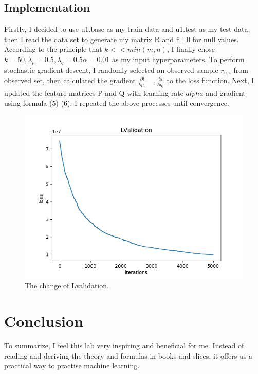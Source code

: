 \documentclass[journal, a4paper]{IEEEtran}
\begin{document}
\subsection{Implementation}
Firstly, I decided to use u1.base as my train data and u1.test as my test data, then I read the data set to generate my matrix R and fill 0 for null values. According to the principle that $k << min(m,n)$, I finally chose $k = 50, \lambda_p = 0.5, \lambda_q = 0.5 \alpha = 0.01$ as my input hyperparameters. To perform stochastic gradient descent, I randomly selected an observed sample $r_{u,i}$ from observed set, then calculated the gradient $\frac{\partial l}{\partial p_u} \quad, \frac{\partial l}{\partial q_i}$ to the loss function. Next, I updated the feature matrices P and Q with learning rate $alpha$ and gradient using formula (5) (6). I repeated the above processes until convergence.
\begin{figure}[!hbt]
	\begin{center}
	\includegraphics[width=\columnwidth]{result.png}
	\caption{The change of Lvalidation.}
	\label{fig2}
	\end{center}
\end{figure}
\par


\section{Conclusion}
	To summarize, I feel this lab very inspiring and beneficial for me. Instead of reading and deriving the theory and formulas in books and slices, it offers us a practical way to practise machine learning.


\end{document}
